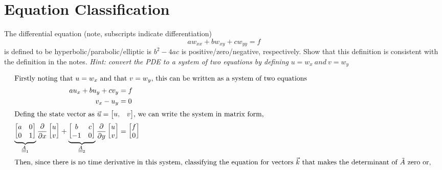 \section{Equation Classification}
The differential equation (note, subscripts indicate differentiation)
\begin{equation*}
    aw_{xx} + bw_{xy} + cw_{yy} = f
\end{equation*}
is defined to be hyperbolic/parabolic/elliptic is $b^2-4ac$ is positive/zero/negative, respectively.  Show that this definition is consistent with the definition in the notes. \textit{Hint: convert the PDE to a system of two equations by defining} $\mathit u = w_x\ \textit{and}\ v = w_y$

\vspace{-0.25in}
\begin{adjustwidth}{2.5em}{0pt}
    \begin{align*}
        \shortintertext{Firstly noting that $u = w_x$ and that $v = w_y$, this can be written as a system of two equations}
        au_x + bu_y + cv_y & = f\\
        v_x - u_y & = 0\\
        \shortintertext{Defing the state vector as $\vec{u} = \begin{bmatrix} u, & v \end{bmatrix}$, we can write the system in matrix form,}
        \underbrace{\begin{bmatrix} a & 0\\ 0 & 1 \end{bmatrix}}_{\doubleunderline{A}_1} \frac{\partial }{\partial x}\begin{bmatrix} u\\ v \end{bmatrix} + \underbrace{\begin{bmatrix} b & c\\ -1 & 0 \end{bmatrix}}_{\doubleunderline{A}_2} \frac{\partial }{\partial y}\begin{bmatrix} u\\v \end{bmatrix} & = \begin{bmatrix}
            f\\ 0
        \end{bmatrix}\\
        \shortintertext{Then, since there is no time derivative in this system, classifying the equation for vectors $\vec{k}$ that makes the determinant of $\tilde{A}$ zero or, }

\end{align*}
\end{adjustwidth}
